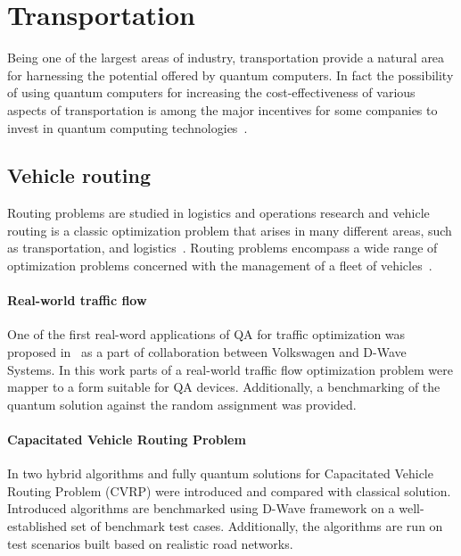 \documentclass[a4paper,11pt]{article}
\begin{document}

\section{Transportation}

Being one of the largest areas of industry, transportation provide a natural area for harnessing the potential offered by quantum computers. In fact the possibility of using quantum computers for increasing the cost-effectiveness of various aspects of transportation is among the major incentives for some companies to invest in quantum computing technologies~\cite{bentley2022quantum, cooper2022exploring}.

\subsection{Vehicle routing}

Routing problems are studied in logistics and operations research and 
vehicle routing is a classic optimization problem that arises in many different areas, such as transportation, and logistics~\cite{dantzig1959truck,toth2002vehicle}. Routing problems encompass a wide range of optimization problems concerned with the management of a fleet of vehicles~\cite{harwood2021formulating}. 

\paragraph{Real-world traffic flow} One of the first real-word applications of QA for traffic optimization was proposed in~\cite{neukart2017traffic} as a part of collaboration between Volkswagen and D-Wave Systems. In this work parts of a real-world traffic flow optimization problem were mapper to a form suitable for QA devices. Additionally, a benchmarking of the quantum solution against the random assignment was provided.

\paragraph{Capacitated Vehicle Routing Problem} In \cite{borowski2020new} two hybrid algorithms and fully quantum solutions for Capacitated Vehicle Routing Problem (CVRP) were introduced and compared with classical solution. Introduced algorithms are benchmarked using D-Wave framework on a well-established set of benchmark test cases. Additionally, the algorithms are run on test scenarios built based on realistic road networks.
\end{document}
